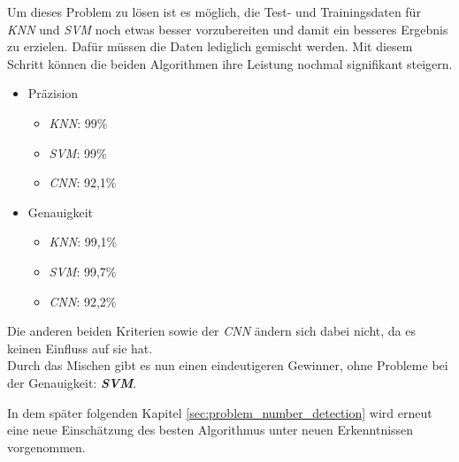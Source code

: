 Um dieses Problem zu lösen ist es möglich, die Test- und Trainingsdaten für \textit{KNN} und \textit{SVM} noch etwas besser vorzubereiten und damit ein besseres Ergebnis zu erzielen. Dafür müssen die Daten lediglich gemischt werden. Mit diesem Schritt können die beiden Algorithmen ihre Leistung nochmal signifikant steigern.

\begin{itemize}
    \item Präzision
          \begin{itemize}
              \item \textit{KNN}: 99\%
              \item \textit{SVM}: 99\%
              \item \textit{CNN}: 92,1\%
          \end{itemize}
    \item Genauigkeit
          \begin{itemize}
              \item \textit{KNN}: 99,1\%
              \item \textit{SVM}: 99,7\%
              \item \textit{CNN}: 92,2\%
          \end{itemize}
\end{itemize}
Die anderen beiden Kriterien sowie der \textit{CNN} ändern sich dabei nicht, da es keinen Einfluss auf sie hat.\\\hfill
Durch das Mischen gibt es nun einen eindeutigeren Gewinner, ohne Probleme bei der Genauigkeit: \textit{\textbf{SVM}}.\\\par

In dem später folgenden Kapitel \ref{sec:problem_number_detection} wird erneut eine neue Einschätzung des besten Algorithmus unter neuen Erkenntnissen vorgenommen.
